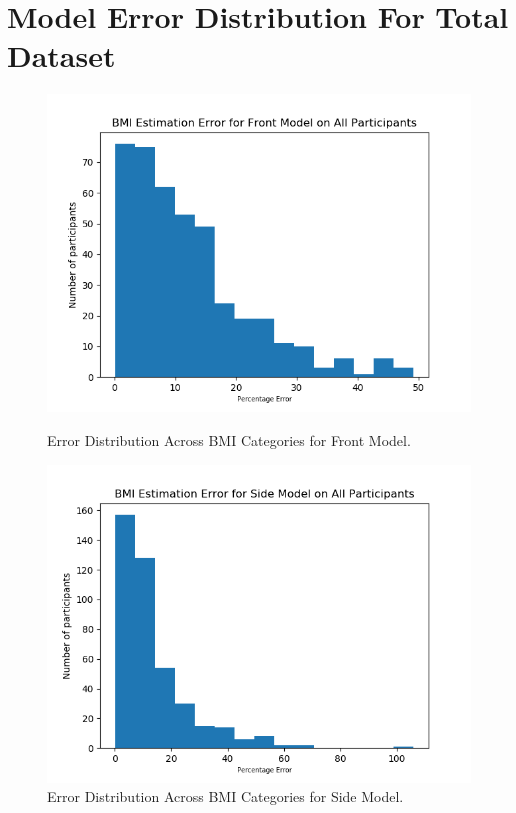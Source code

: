 \documentclass[conference]{IEEEtran}
\begin{document}
\section{Model Error Distribution For Total Dataset}

\begin{figure}[H]
    \centering
    \begin{minipage}[b]{0.35\textwidth}
    \includegraphics[width=\linewidth]{fronterrorspread.png}
    \caption{Error Distribution Across BMI Categories for Front Model.}
    \label{fig:fronterrorspread}
    \end{minipage}
    \hspace{1cm}
    \begin{minipage}[b]{0.35\textwidth}
    \includegraphics[width=\linewidth]{sideerrorspread.png}
    \caption{Error Distribution Across BMI Categories for Side Model.}
    \label{fig:sideerrorspread}
    \end{minipage}
\end{figure}
\end{document}
